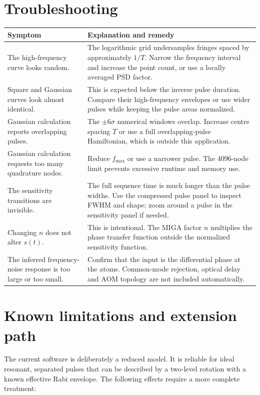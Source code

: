 \documentclass[11pt,a4paper]{article}
\begin{document}
\section{Troubleshooting}

\begin{longtable}{@{}p{}p{}@{}}
\toprule
Symptom & Explanation and remedy \\
\midrule
\endhead
The high-frequency curve looks random. & The logarithmic grid undersamples fringes spaced by approximately $1/T$. Narrow the frequency interval and increase the point count, or use a locally averaged PSD factor. \\
Square and Gaussian curves look almost identical. & This is expected below the inverse pulse duration. Compare their high-frequency envelopes or use wider pulses while keeping the pulse areas normalized. \\
Gaussian calculation reports overlapping pulses. & The $\pm6\sigma$ numerical windows overlap. Increase centre spacing $T$ or use a full overlapping-pulse Hamiltonian, which is outside this application. \\
Gaussian calculation requests too many quadrature nodes. & Reduce $f_{\max}$ or use a narrower pulse. The 4096-node limit prevents excessive runtime and memory use. \\
The sensitivity transitions are invisible. & The full sequence time is much longer than the pulse widths. Use the compressed pulse panel to inspect FWHM and shape; zoom around a pulse in the sensitivity panel if needed. \\
Changing $n$ does not alter $s(t)$. & This is intentional. The MIGA factor $n$ multiplies the phase transfer function outside the normalized sensitivity function. \\
The inferred frequency-noise response is too large or too small. & Confirm that the input is the differential phase at the atoms. Common-mode rejection, optical delay and AOM topology are not included automatically. \\
\bottomrule
\end{longtable}

\section{Known limitations and extension path}

The current software is deliberately a reduced model. It is reliable for ideal resonant, separated pulses that can be described by a two-level rotation with a known effective Rabi envelope. The following effects require a more complete treatment:
\end{document}

